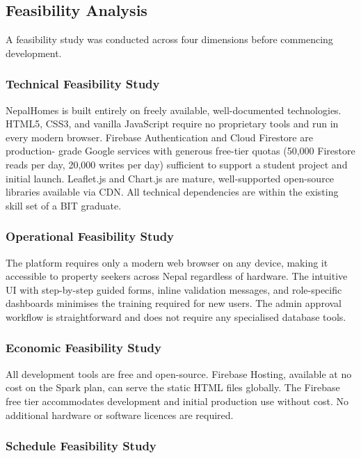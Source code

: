 \documentclass[12pt,a4paper]{report}
\begin{document}
\subsection{Feasibility Analysis}

A feasibility study was conducted across four dimensions before commencing
development.

\subsubsection{Technical Feasibility Study}

NepalHomes is built entirely on freely available, well-documented technologies.
HTML5, CSS3, and vanilla JavaScript require no proprietary tools and run in
every modern browser. Firebase Authentication and Cloud Firestore are production-
grade Google services with generous free-tier quotas (50,000 Firestore reads
per day, 20,000 writes per day) sufficient to support a student project and
initial launch. Leaflet.js and Chart.js are mature, well-supported open-source
libraries available via CDN. All technical dependencies are within the existing
skill set of a BIT graduate.

\subsubsection{Operational Feasibility Study}

The platform requires only a modern web browser on any device, making it
accessible to property seekers across Nepal regardless of hardware. The intuitive
UI with step-by-step guided forms, inline validation messages, and role-specific
dashboards minimises the training required for new users. The admin approval
workflow is straightforward and does not require any specialised database tools.

\subsubsection{Economic Feasibility Study}

All development tools are free and open-source. Firebase Hosting, available at
no cost on the Spark plan, can serve the static HTML files globally. The Firebase
free tier accommodates development and initial production use without cost. No
additional hardware or software licences are required.

\subsubsection{Schedule Feasibility Study}
\end{document}
